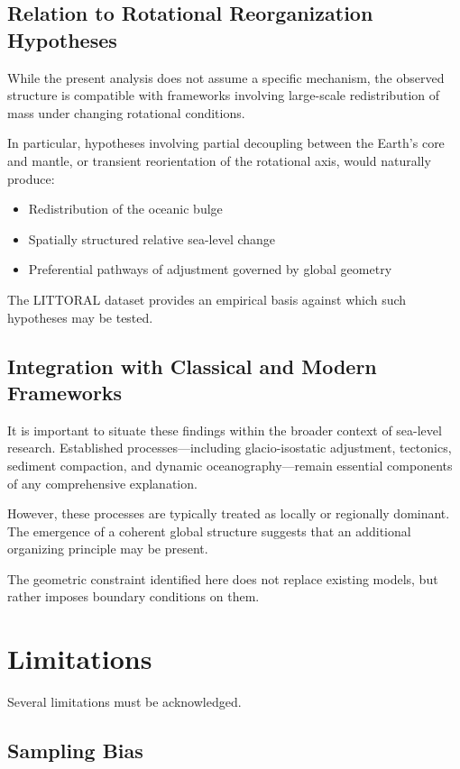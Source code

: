 \documentclass[twocolumn,10pt]{article}
\begin{document}
\subsection{Relation to Rotational Reorganization Hypotheses}

While the present analysis does not assume a specific mechanism, the observed structure is compatible with frameworks involving large-scale redistribution of mass under changing rotational conditions.

In particular, hypotheses involving partial decoupling between the Earth's core and mantle, or transient reorientation of the rotational axis, would naturally produce:

\begin{itemize}
\item Redistribution of the oceanic bulge
\item Spatially structured relative sea-level change
\item Preferential pathways of adjustment governed by global geometry
\end{itemize}

The LITTORAL dataset provides an empirical basis against which such hypotheses may be tested.

\subsection{Integration with Classical and Modern Frameworks}

It is important to situate these findings within the broader context of sea-level research. Established processes---including glacio-isostatic adjustment, tectonics, sediment compaction, and dynamic oceanography---remain essential components of any comprehensive explanation.

However, these processes are typically treated as locally or regionally dominant. The emergence of a coherent global structure suggests that an additional organizing principle may be present.

The geometric constraint identified here does not replace existing models, but rather imposes boundary conditions on them.

\section{Limitations}

Several limitations must be acknowledged.

\subsection{Sampling Bias}
\end{document}
